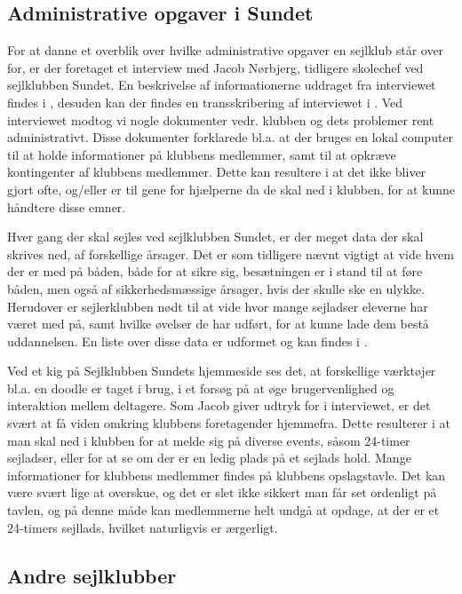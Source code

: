 \subsection{Administrative opgaver i Sundet}

For at danne et overblik over hvilke administrative opgaver en sejlklub står over for, er der foretaget et interview med
Jacob Nørbjerg, tidligere skolechef ved sejlklubben Sundet. En beskrivelse af informationerne uddraget fra interviewet
findes i , desuden kan der findes en transskribering af interviewet i
. Ved interviewet modtog vi nogle dokumenter vedr. klubben og dets problemer
rent administrativt. Disse dokumenter forklarede bl.a. at der bruges en lokal computer til at holde informationer på klubbens
medlemmer, samt til at opkræve kontingenter af klubbens medlemmer. Dette kan resultere i at det ikke bliver gjort ofte,
og/eller er til gene for hjælperne da de skal ned i klubben, for at kunne håndtere disse emner.

Hver gang der skal sejles ved sejlklubben Sundet, er der meget data der skal skrives ned, af forskellige årsager. Det er
som tidligere nævnt vigtigt at vide hvem der er med på båden, både for at sikre sig, besætningen er i stand til at føre
båden, men også af sikkerhedsmæssige årsager, hvis der skulle ske en ulykke. Herudover er sejlerklubben nødt til at vide
hvor mange sejladser eleverne har været med på, samt hvilke øvelser de har udført, for at kunne lade dem bestå
uddannelsen. En liste over disse data er udformet og kan findes i .

Ved et kig på Sejlklubben Sundets hjemmeside \citep{SundetUdlaan} ses det, at forskellige værktøjer bl.a. en doodle er
taget i brug, i et forsøg på at øge brugervenlighed og interaktion mellem deltagere. Som Jacob giver udtryk for i
interviewet, er det svært at få viden omkring klubbens foretagender hjemmefra. Dette resulterer i at man skal
ned i klubben for at melde sig på diverse events, såsom 24-timer sejladser, eller for at se om der er en ledig plads på
et sejlads hold. Mange informationer for klubbens medlemmer findes på klubbens opslagstavle. Det kan være svært lige at
overskue, og det er slet ikke sikkert man får set ordenligt på tavlen, og på denne måde kan medlemmerne helt undgå at
opdage, at der er et 24-timers sejllads, hvilket naturligvis er ærgerligt.

\subsection{Andre sejlklubber}

